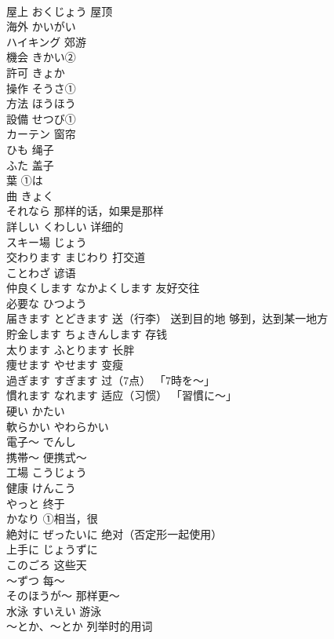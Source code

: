 \documentclass[8pt]{extreport}
\begin{document}
\begin{CJK}{UTF8}{min}
\\	屋上	おくじょう 屋顶	
\\	海外	かいがい	
\\	ハイキング	郊游	
\\	機会	きかい②	
\\	許可	きょか 
\\	操作	そうさ①	
\\	方法	ほうほう	
\\	設備	せつび①	
\\	カーテン	窗帘	
\\	ひも	绳子	
\\	ふた	盖子	
\\	葉	①は	
\\	曲	きょく	
\\	それなら	那样的话，如果是那样	
\\	詳しい	くわしい 详细的	
\\	スキー場	じょう	
\\	交わります	まじわり 打交道	
\\	ことわざ	谚语	
\\	仲良くします	なかよくします 友好交往	
\\	必要な	ひつよう	
\\	届きます	とどきます 送（行李） 送到目的地 够到，达到某一地方	
\\	貯金します	ちょきんします 存钱	
\\	太ります	ふとります 长胖	
\\	痩せます	やせます 变瘦	
\\	過ぎます	すぎます 过（7点） 「7時を〜」	
\\	慣れます	なれます 适应（习惯） 「習慣に〜」	
\\	硬い	かたい	
\\	軟らかい	やわらかい	
\\	電子〜	でんし	
\\	携帯〜	便携式～	
\\	工場	こうじょう	
\\	健康	けんこう	
\\	やっと	终于	
\\	かなり	①相当，很	
\\	絶対に	ぜったいに 绝对（否定形一起使用）	
\\	上手に	じょうずに	
\\	このごろ	这些天	
\\	〜ずつ	每～	
\\	そのほうが〜	那样更～	
\\	水泳	すいえい 游泳	
\\	〜とか、〜とか	列举时的用词	

\end{CJK}
\end{document}
